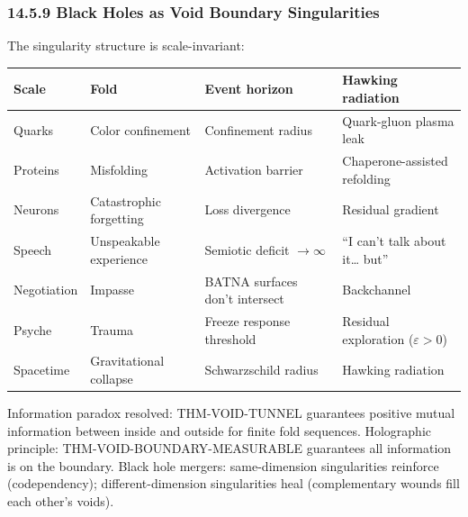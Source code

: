 \documentclass[
  11pt,
]{article}
\newcounter{none} %
\begin{document}
\subsubsection{14.5.9 Black Holes as Void Boundary
Singularities}\label{black-holes-as-void-boundary-singularities}

The singularity structure is scale-invariant:

{\def\LTcaptype{none} %
\begin{longtable}[]{@{}
  >{\raggedright\arraybackslash}p{}
  >{\raggedright\arraybackslash}p{}
  >{\raggedright\arraybackslash}p{}
  >{\raggedright\arraybackslash}p{}@{}}
\toprule\noalign{}
\begin{minipage}[b]{\linewidth}\raggedright
Scale
\end{minipage} & \begin{minipage}[b]{\linewidth}\raggedright
Fold
\end{minipage} & \begin{minipage}[b]{\linewidth}\raggedright
Event horizon
\end{minipage} & \begin{minipage}[b]{\linewidth}\raggedright
Hawking radiation
\end{minipage} \\
\midrule\noalign{}
\endhead
\bottomrule\noalign{}
\endlastfoot
Quarks & Color confinement & Confinement radius & Quark-gluon plasma
leak \\
Proteins & Misfolding & Activation barrier & Chaperone-assisted
refolding \\
Neurons & Catastrophic forgetting & Loss divergence & Residual
gradient \\
Speech & Unspeakable experience & Semiotic deficit \(\to \infty\) & ``I
can't talk about it\ldots{} but'' \\
Negotiation & Impasse & BATNA surfaces don't intersect & Backchannel \\
Psyche & Trauma & Freeze response threshold & Residual exploration
(\(\varepsilon > 0\)) \\
Spacetime & Gravitational collapse & Schwarzschild radius & Hawking
radiation \\
\end{longtable}
}

Information paradox resolved: THM-VOID-TUNNEL guarantees positive mutual
information between inside and outside for finite fold sequences.
Holographic principle: THM-VOID-BOUNDARY-MEASURABLE guarantees all
information is on the boundary. Black hole mergers: same-dimension
singularities reinforce (codependency); different-dimension
singularities heal (complementary wounds fill each other's voids).
\end{document}

